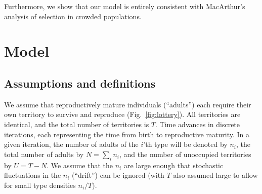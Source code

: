 \documentclass[11pt]{article}
\begin{document}
Furthermore, we show that our model is entirely consistent with MacArthur's analysis of selection in crowded populations. 



 
\section*{Model}\label{sec:model}

\subsection*{Assumptions and definitions} 

We assume that reproductively mature individuals (``adults'') each require their own territory to survive and reproduce (Fig.~\ref{fig:lottery}). All territories are identical, and the total number of territories is $T$. Time advances in discrete iterations, each representing the time from birth to reproductive maturity. In a given iteration, the number of adults of the $i$'th type will be denoted by $n_i$, the total number of adults by $N=\sum_i n_i$, and the number of unoccupied territories by $U=T-N$. We assume that the $n_i$ are large enough that stochastic fluctuations in the $n_i$ (``drift'') can be ignored (with $T$ also assumed large to allow for small type densities $n_i/T$).
\end{document}

